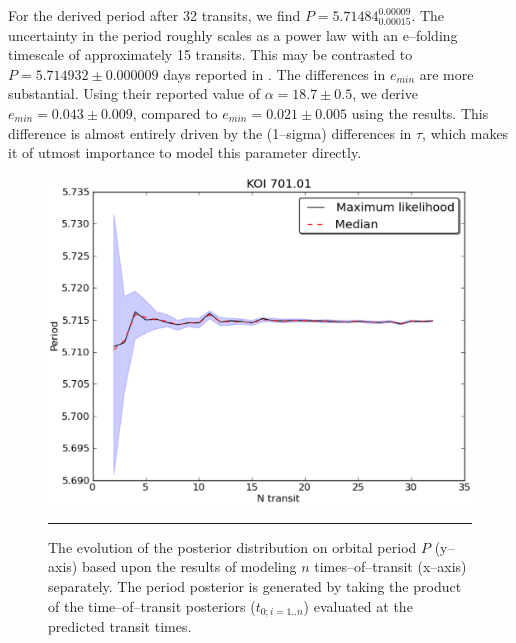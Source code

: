 For the derived period after 32 transits, we find $P =
5.71484_{0.00015}^{0.00009}$.  The uncertainty in the period roughly
scales as a power law with an e--folding timescale of approximately 15
transits.  This may be contrasted to $P = 5.714932 \pm 0.000009$ days
reported in \cite{2013arXiv1304.7387B}.  The differences in $e_{min}$
are more substantial.  Using their reported value of $\alpha =
18.7 \pm 0.5$, we derive $e_{min} = 0.043 \pm 0.009$, compared to
$e_{min} = 0.021 \pm 0.005$ using the \cite{2013arXiv1304.7387B}
results.  This difference is almost entirely driven by the (1--sigma)
differences in $\tau$, which makes it of utmost importance to model
this parameter directly.

\begin{figure}[t] 
  \begin{minipage}[c]{0.57\textwidth}
    \includegraphics[width=\textwidth]{figures/period.eps}
  \end{minipage}\hfill
  \begin{minipage}[c]{0.4\textwidth}
    \caption{The evolution of the posterior distribution on orbital
      period $P$ (y--axis) based upon the results of modeling $n$
      times--of--transit (x--axis) separately.  The period posterior
      is generated by taking the product of the time--of--transit
      posteriors ($t_{0;i=1..n}$) evaluated at the predicted transit
      times.  }
    \label{fig-period}
    \hspace*{\fill}  
    \hrule
  \end{minipage}
\end{figure}

